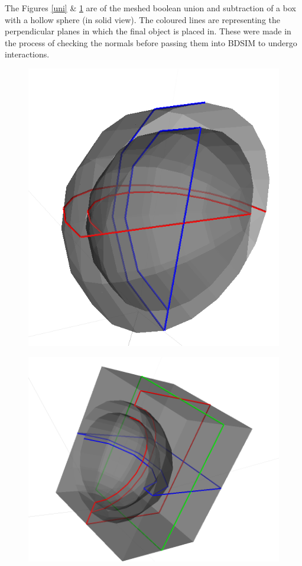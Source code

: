 \documentclass[12pt,a4paper]{article}
\begin{document}
\noindent The Figures \ref{uni} \& \ref{sub} are of the meshed boolean union and subtraction of a box with a hollow sphere (in solid view). The coloured lines are representing the perpendicular planes in which the final object is placed in. These were made in the process of checking the normals before passing them into BDSIM to undergo interactions.
\\
\begin{figure}[h!]
\centering
\begin{minipage}{.4\textwidth}
  \centering
  \includegraphics[height=0.5\linewidth]{Images//Booleans/SphereUnion.png}
  \label{uni}
\end{minipage}%
\begin{minipage}{.4\textwidth}
  \centering
  \includegraphics[height=0.5\linewidth]{Images//Booleans//SphereSubtraction.png}
  \label{sub}
\end{minipage}%
\end{figure}
\end{document}
